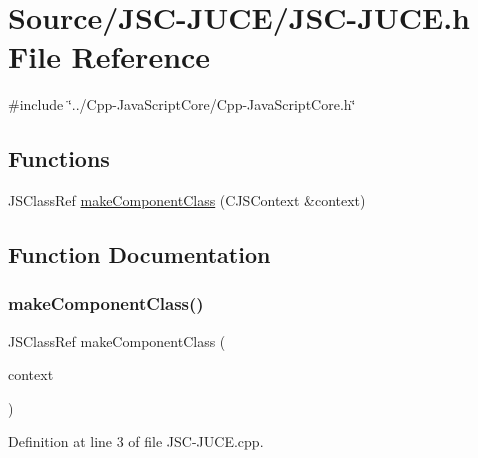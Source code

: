 \hypertarget{_j_s_c-_j_u_c_e_8h}{}\section{Source/\+J\+S\+C-\/\+J\+U\+C\+E/\+J\+S\+C-\/\+J\+U\+CE.h File Reference}
\label{_j_s_c-_j_u_c_e_8h}
{\ttfamily \#include \char`\"{}../\+Cpp-\/\+Java\+Script\+Core/\+Cpp-\/\+Java\+Script\+Core.\+h\char`\"{}}\newline
\subsection*{Functions}
\begin{DoxyCompactItemize}
\item 
J\+S\+Class\+Ref \mbox{\hyperlink{_j_s_c-_j_u_c_e_8h_ab10068264b712931698990ee9a47ce3f}{make\+Component\+Class}} (C\+J\+S\+Context \&context)
\end{DoxyCompactItemize}


\subsection{Function Documentation}
\mbox{\label{_j_s_c-_j_u_c_e_8h_ab10068264b712931698990ee9a47ce3f}} 
\subsubsection{\texorpdfstring{make\+Component\+Class()}{makeComponentClass()}}
{\footnotesize\ttfamily J\+S\+Class\+Ref make\+Component\+Class (\begin{DoxyParamCaption}\item[{C\+J\+S\+Context \&}]{context }\end{DoxyParamCaption})}



Definition at line 3 of file J\+S\+C-\/\+J\+U\+C\+E.\+cpp.

